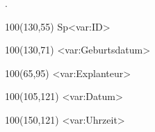 \documentclass[a4]{scrreprt}
\begin{document}
\baselineskip15pt
.
\textblockorigin{1mm}{1mm}
\setlength{\TPHorizModule}{1mm}
\setlength{\TPVertModule}{1mm}

\begin{textblock}{100}(130,55) 
Sp<var:ID>
\end{textblock}
\begin{textblock}{100}(130,71) 
<var:Geburtsdatum>
\end{textblock}
\begin{textblock}{100}(65,95) 
<var:Explanteur>
\end{textblock}
\begin{textblock}{100}(105,121) 
<var:Datum>
\end{textblock}
\begin{textblock}{100}(150,121) 
<var:Uhrzeit>
\end{textblock}
\end{document}
